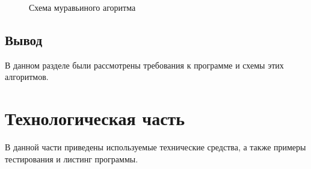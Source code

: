 \documentclass[12pt]{report}
\begin{document}
\begin{figure}[h]
        	\caption{Схема муравьиного агоритма}
        	\label{fig:ant}
\end{figure}
\newpage

\section*{Вывод}
В данном разделе были рассмотрены требования к программе и схемы этих алгоритмов.


 

\chapter{Технологическая часть}
В данной части приведены используемые технические средства, а также примеры тестирования и листинг программы.
\end{document}
